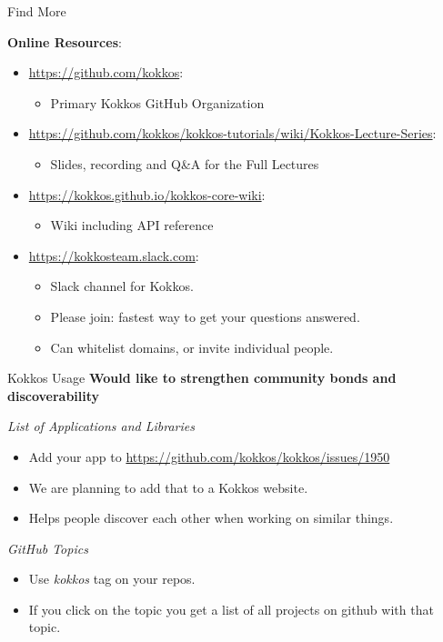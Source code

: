 \begin{frame}{Find More}

\textbf{Online Resources}:

\begin{itemize}
        \item \url{https://github.com/kokkos}:
                \begin{itemize}
                        \item Primary Kokkos GitHub Organization
                \end{itemize}
        \item \url{https://github.com/kokkos/kokkos-tutorials/wiki/Kokkos-Lecture-Series}:
                \begin{itemize}
			\item{Slides, recording and Q\&A for the Full Lectures}
                \end{itemize}
        \item \url{https://kokkos.github.io/kokkos-core-wiki}:
                \begin{itemize}
                        \item Wiki including API reference
                \end{itemize}
        \item \url{https://kokkosteam.slack.com}:
                \begin{itemize}
                        \item Slack channel for Kokkos.
                        \item Please join: fastest way to get your questions answered.
                        \item Can whitelist domains, or invite individual people.
                \end{itemize}
\end{itemize}

\end{frame}

\begin{frame}[fragile]{Kokkos Usage}
  \textbf{Would like to strengthen community bonds and discoverability}

\vspace{10pt}
\textit{List of Applications and Libraries}
\begin{itemize}
\item Add your app to \url{https://github.com/kokkos/kokkos/issues/1950}
\item We are planning to add that to a Kokkos website.
\item Helps people discover each other when working on similar things.
\end{itemize}

\vspace{10pt}
\textit{GitHub Topics}
\begin{itemize}
\item Use \textit{kokkos} tag on your repos.
\item If you click on the topic you get a list of all projects on github with that topic.
\end{itemize}

\end{frame}

